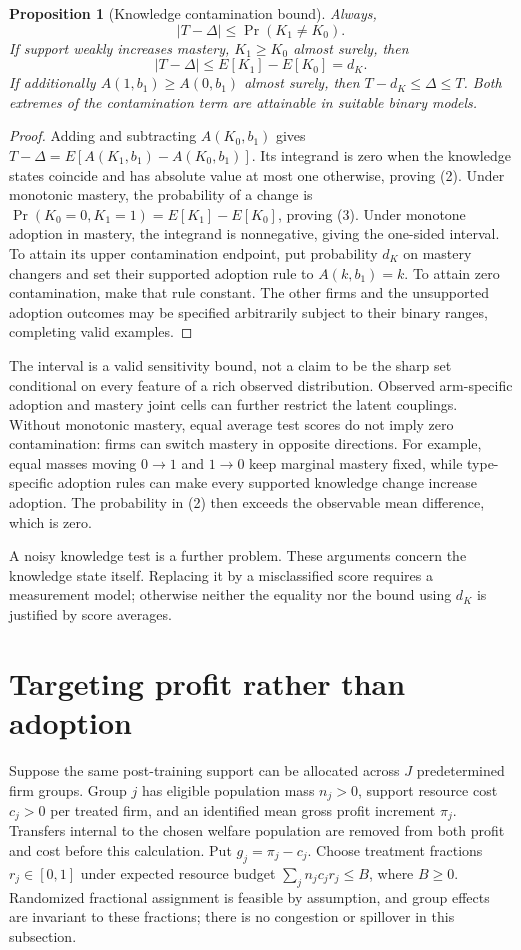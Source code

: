 \documentclass[11pt]{article}
\newtheorem{proposition}[theorem]{Proposition}
\theoremstyle{definition}
\begin{document}
\begin{proposition}[Knowledge contamination bound]
Always,
\[
 |T-\Delta|\le\Pr(K_1\ne K_0).
 \tag{2}
\]
If support weakly increases mastery, $K_1\ge K_0$ almost surely, then
\[
 |T-\Delta|\le E[K_1]-E[K_0]=d_K.
 \tag{3}
\]
If additionally $A(1,b_1)\ge A(0,b_1)$ almost surely, then
$T-d_K\le\Delta\le T$. Both extremes of the contamination term are attainable in suitable binary models.
\end{proposition}
\begin{proof}
Adding and subtracting $A(K_0,b_1)$ gives
$T-\Delta=E[A(K_1,b_1)-A(K_0,b_1)]$.
Its integrand is zero when the knowledge states coincide and has absolute value at most one otherwise, proving (2). Under monotonic mastery, the probability of a change is $\Pr(K_0=0,K_1=1)=E[K_1]-E[K_0]$, proving (3). Under monotone adoption in mastery, the integrand is nonnegative, giving the one-sided interval. To attain its upper contamination endpoint, put probability $d_K$ on mastery changers and set their supported adoption rule to $A(k,b_1)=k$. To attain zero contamination, make that rule constant. The other firms and the unsupported adoption outcomes may be specified arbitrarily subject to their binary ranges, completing valid examples.
\end{proof}
The interval is a valid sensitivity bound, not a claim to be the sharp set conditional on every feature of a rich observed distribution. Observed arm-specific adoption and mastery joint cells can further restrict the latent couplings. Without monotonic mastery, equal average test scores do not imply zero contamination: firms can switch mastery in opposite directions. For example, equal masses moving $0\to1$ and $1\to0$ keep marginal mastery fixed, while type-specific adoption rules can make every supported knowledge change increase adoption. The probability in (2) then exceeds the observable mean difference, which is zero.

A noisy knowledge test is a further problem. These arguments concern the knowledge state itself. Replacing it by a misclassified score requires a measurement model; otherwise neither the equality nor the bound using $d_K$ is justified by score averages.

\section*{Targeting profit rather than adoption}
Suppose the same post-training support can be allocated across $J$ predetermined firm groups. Group $j$ has eligible population mass $n_j>0$, support resource cost $c_j>0$ per treated firm, and an identified mean gross profit increment $\pi_j$. Transfers internal to the chosen welfare population are removed from both profit and cost before this calculation. Put $g_j=\pi_j-c_j$. Choose treatment fractions $r_j\in[0,1]$ under expected resource budget $\sum_jn_jc_jr_j\le B$, where $B\ge0$. Randomized fractional assignment is feasible by assumption, and group effects are invariant to these fractions; there is no congestion or spillover in this subsection.
\end{document}
